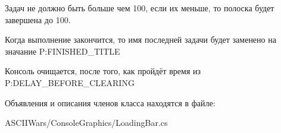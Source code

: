 Задач не должно быть больше чем 100, если их меньше, то полоска будет завершена до 100.

Когда выполнение закончится, то имя последней задачи будет заменено на значание P\+:\+F\+I\+N\+I\+S\+H\+E\+D\+\_\+\+T\+I\+T\+LE

Консоль очищается, после того, как пройдёт время из P\+:\+D\+E\+L\+A\+Y\+\_\+\+B\+E\+F\+O\+R\+E\+\_\+\+C\+L\+E\+A\+R\+I\+NG

Объявления и описания членов класса находятся в файле\+:\begin{DoxyCompactItemize}
\item 
A\+S\+C\+I\+I\+Wars/\+Console\+Graphics/Loading\+Bar.\+cs\end{DoxyCompactItemize}
